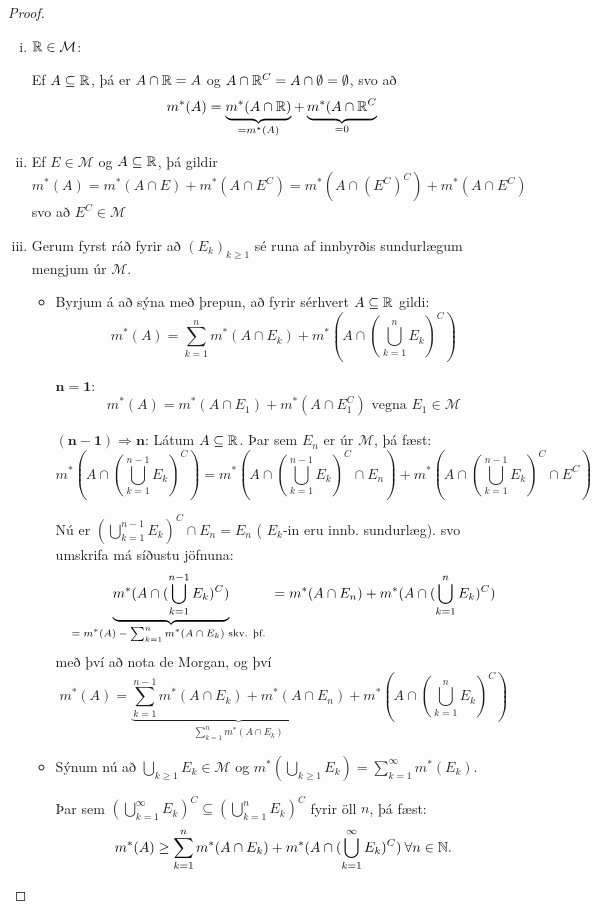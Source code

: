 \documentclass[12pt]{report}
\newcommand{\cM}{\mathcal{M}}
\begin{document}
\begin{proof}
  \begin{enumerate}[(i)]
  \item $\R \in \cM $:

    Ef $A \subseteq \mathbb{R}$, þá er $A \cap \mathbb{R} = A$ og
    $A \cap \mathbb{R}^C = A \cap \emptyset = \emptyset$, svo að
    \[ m^*(A) = \underbrace{m^*(A \cap \mathbb{R})}_{= m^*(A)} +
    \underbrace{m^*(A\cap \mathbb{R}^C}_{= 0}\]
  \item Ef $E \in \cM$ og $A \subseteq \mathbb{R}$, þá gildir
    \[ m^*(A) = m^*(A \cap E) + m^*(A \cap E^C) = m^*(A \cap (
    E^C)^C) + m^*(A \cap E^C) \] svo að $E^C \in \cM$
  \item Gerum fyrst ráð fyrir að $(E_k)_{k \geq 1}$ sé runa af
    innbyrðis sundurlægum mengjum úr $\cM$.

    \begin{itemize}
    \item Byrjum á að sýna með þrepun, að fyrir sérhvert
      $A \subseteq \mathbb{R}$ gildi:
      \[ m^*(A) = \sum_{k=1}^n m^*(A \cap E_k) + m^*(A \cap
      (\bigcup_{k=1}^n E_k)^C) \]

      $\mathbf{n = 1}$:
      \[m^*(A) = m^*(A \cap E_1) + m^*(A \cap E_1^C) \text{ vegna
      } E_1 \in \cM \]


      $\mathbf{(n-1) \Rightarrow n}$: Látum $A \subseteq \mathbb{R}$. Þar
      sem $E_n$ er úr $\cM$, þá fæst:
      \[ m^*(A \cap (\bigcup_{k=1}^{n-1} E_k)^C) = m^*(A \cap
      (\bigcup_{k=1}^{n-1} E_k)^C \cap E_n) + m^*(A \cap
      (\bigcup_{k=1}^{n-1} E_k)^C \cap E^C) \]

      Nú er $(\bigcup_{k=1}^{n-1} E_k)^C \cap E_n = E_n$ (
      $E_k$-in eru innb. sundurlæg).  svo umskrifa má síðustu
      jöfnuna:
      \[ \underbrace{m^*(A \cap (\bigcup_{k=1}^{n-1}
        E_k)^C)}_{\text{$= m^*(A) - \sum_{k=1}^n m^*(A \cap
        E_k)$ skv. þf. }} = m^*(A \cap E_n) + m^*(A \cap
      (\bigcup_{k=1}^{n} E_k)^C ) \]
      með því að nota de Morgan, og því
      \[ m^*(A) = \underbrace{\sum_{k=1}^{n-1} m^*(A \cap E_k) +
        m^*(A \cap E_n)}_{\sum_{k=1}^{n} m^*(A\cap E_k)} + m^*(A
      \cap (\bigcup_{k=1}^{n} E_k)^C) \]
    \item Sýnum nú að $\bigcup_{k \geq 1} E_k \in \cM$ og
      $m^*(\bigcup_{k \geq 1} E_k) = \sum_{k=1}^{\infty}
      m^*(E_k)$.

      Þar sem
      $(\bigcup_{k=1}^{\infty} E_k)^C \subseteq (\bigcup_{k=1}^n
      E_k)^C$ fyrir öll $n$, þá fæst:
      \[ m^*(A) \geq \sum_{k=1}^n m^*(A \cap E_k) + m^*(A \cap
      (\bigcup_{k=1}^{\infty} E_k)^C) \: \forall n \in \mathbb{N}. \]


\end{itemize}
\end{enumerate}
\end{proof}
\end{document}
